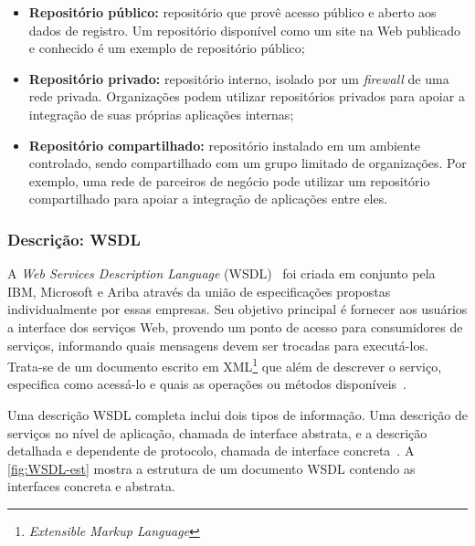 \documentclass[12pt]{report} %
\begin{document}
		\begin{itemize}
		    \item \textbf{Repositório público:} repositório que provê acesso público e aberto aos dados de registro.
			    Um repositório disponível como um site na Web publicado e conhecido é um exemplo de repositório público;
		    \item \textbf{Repositório privado:} repositório interno, isolado por um \textit{firewall} de uma rede privada.
			    Organizações podem utilizar repositórios privados para apoiar a integração de suas próprias aplicações internas;
		    \item \textbf{Repositório compartilhado:} repositório instalado em um ambiente controlado, sendo compartilhado com um grupo limitado de organizações.
			    Por exemplo, uma rede de parceiros de negócio pode utilizar um repositório compartilhado para apoiar a integração de aplicações entre eles.
		\end{itemize}

	    \subsubsection{Descrição: WSDL}
		A \textit{Web Services Description Language} (WSDL)~\cite{WSDL} foi criada em conjunto pela IBM, Microsoft e Ariba através da união de especificações propostas individualmente por essas empresas. %
		Seu objetivo principal é fornecer aos usuários a interface dos serviços Web, provendo um ponto de acesso para consumidores de serviços, informando quais mensagens devem ser trocadas para executá-los.
		Trata-se de um documento escrito em XML\footnote{\textit{Extensible Markup Language}} que além de descrever o serviço, especifica como acessá-lo e quais as operações ou métodos disponíveis~\cite{IntroWS}.
		
		Uma descrição WSDL completa inclui dois tipos de informação.
		Uma descrição de serviços no nível de aplicação, chamada de interface abstrata, e a descrição detalhada e dependente de protocolo, chamada de interface concreta~\cite{IntroWS}.
		A \autoref{fig:WSDL-est} mostra a estrutura de um documento WSDL contendo as interfaces concreta e abstrata.
				
\end{document}
